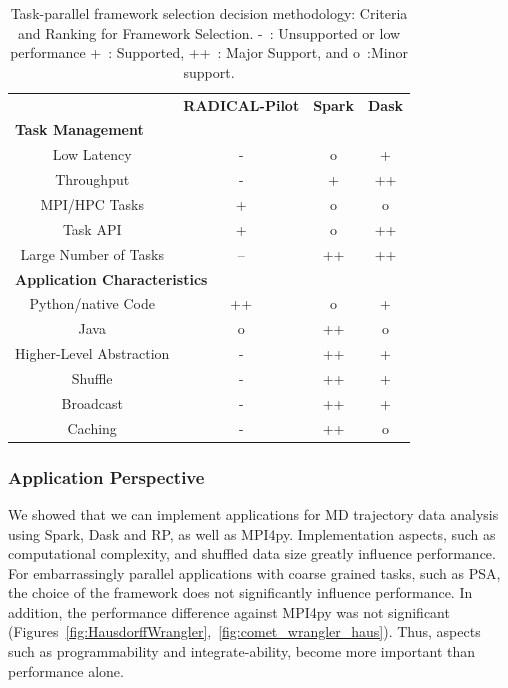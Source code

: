 \begin{table}[t]
    \scriptsize
    \centering
    \begin{tabular}{@{}cccc@{}}
        \toprule
        &\textbf{RADICAL-Pilot}     &\textbf{Spark} &\textbf{Dask}\\
        \multicolumn{4}{l}{\textbf{Task Management}} \\
        \midrule
        Low Latency   &- &o &+\\
        Throughput    &- &+ &++\\
        MPI/HPC Tasks &+ &o &o\\
        Task API   &+ &o &++\\
        Large Number of Tasks   &-- &++ &++\\\hline
        \multicolumn{4}{l}{\textbf{Application Characteristics}}\\\midrule
        Python/native Code &++ &o &+\\
        Java               &o &++ &o\\
        Higher-Level Abstraction &- &++ &+\\
        Shuffle                  &- &++ &+\\
        Broadcast                &- &++ &+\\
        Caching                  &- &++ &o\\
        \bottomrule
    \end{tabular}
    \caption{Task-parallel framework selection decision methodology: Criteria
        and Ranking for Framework Selection. -~: Unsupported or low performance
        +~: Supported, ++~: Major Support, and o~:Minor
        support.\label{tab:framework}}
\end{table}

\subsubsection*{Application Perspective}

We showed that we can implement applications for MD trajectory data analysis
using Spark, Dask and RP, as well as MPI4py. Implementation aspects,
such as computational complexity, and shuffled data size greatly influence
performance. For embarrassingly parallel applications with coarse grained tasks,
such as PSA, the choice of the framework does not significantly influence
performance. In addition, the performance difference against MPI4py was not
significant
(Figures~\ref{fig:HausdorffWrangler},~\ref{fig:comet_wrangler_haus}). Thus,
aspects such as programmability and integrate-ability, become more important
than performance alone.

